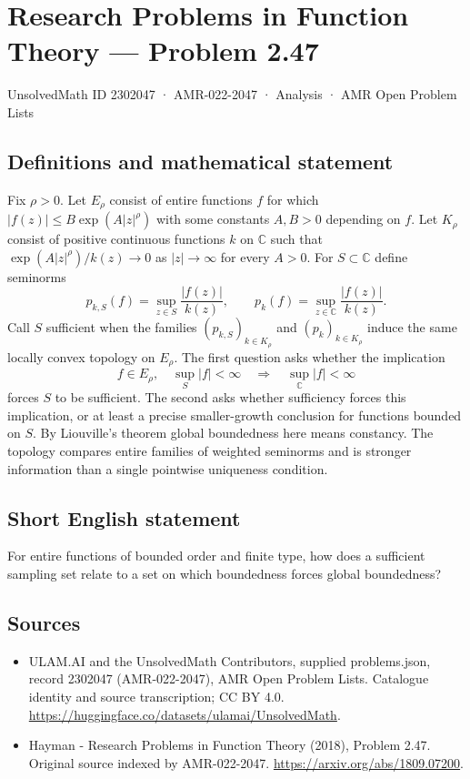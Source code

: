 \documentclass[11pt,a4paper]{article}
\begin{document}
\section*{Research Problems in Function Theory — Problem 2.47}\label{2302047}
{\small UnsolvedMath ID 2302047 · AMR-022-2047 · Analysis · AMR Open Problem Lists}
\subsection{Definitions and mathematical statement}
Fix $\rho>0$. Let $E_\rho$ consist of entire functions $f$ for which
$|f(z)|\le B\exp(A|z|^\rho)$ with some constants $A,B>0$ depending on $f$.
Let $K_\rho$ consist of positive continuous functions $k$ on $\mathbb C$ such that
$\exp(A|z|^\rho)/k(z)\to0$ as $|z|\to\infty$ for every $A>0$.
For $S\subset\mathbb C$ define seminorms
\[
p_{k,S}(f)=\sup_{z\in S}\frac{|f(z)|}{k(z)},\qquad
p_k(f)=\sup_{z\in\mathbb C}\frac{|f(z)|}{k(z)}.
\]
Call $S$ sufficient when the families $(p_{k,S})_{k\in K_\rho}$ and $(p_k)_{k\in K_\rho}$ induce the same locally convex topology on $E_\rho$.
The first question asks whether the implication
\[
f\in E_\rho,\quad\sup_S|f|<\infty
\quad\Longrightarrow\quad \sup_{\mathbb C}|f|<\infty
\]
forces $S$ to be sufficient. The second asks whether sufficiency forces this implication, or at least a precise smaller-growth conclusion for functions bounded on $S$. By Liouville's theorem global boundedness here means constancy. The topology compares entire families of weighted seminorms and is stronger information than a single pointwise uniqueness condition.
\subsection{Short English statement}
For entire functions of bounded order and finite type, how does a sufficient sampling set relate to a set on which boundedness forces global boundedness?
\subsection{Sources}
\begin{itemize}
\item[S1] ULAM.AI and the UnsolvedMath Contributors, supplied problems.json, record 2302047 (AMR-022-2047), AMR Open Problem Lists. Catalogue identity and source transcription; CC BY 4.0.
\url{https://huggingface.co/datasets/ulamai/UnsolvedMath}.
\item[S2] Hayman - Research Problems in Function Theory (2018), Problem 2.47. Original source indexed by AMR-022-2047.
\url{https://arxiv.org/abs/1809.07200}.
\end{itemize}
\end{document}
